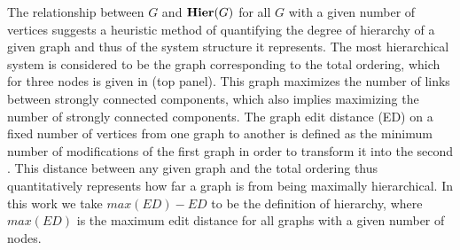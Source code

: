 The relationship between $G$ and $\mathbf{Hier}(G)$ for all $G$ with a given number of vertices suggests a heuristic method of quantifying the degree of hierarchy of a given graph and thus of the system structure it represents. The most hierarchical system is considered to be the graph corresponding to the total ordering, which for three nodes is given in  (top panel). This graph maximizes the number of links between strongly connected components, which also implies maximizing the number of strongly connected components. The graph edit distance (ED) on a fixed number of vertices from one graph to another is defined as the minimum number of modifications of the first graph in order to transform it into the second \cite{Axenovich2011}. This distance between any given graph and the total ordering thus quantitatively represents how far a graph is from being maximally hierarchical. In this work we take $max(ED) - ED$ to be the definition of hierarchy, where $max(ED)$ is the maximum edit distance for all graphs with a given number of nodes.

